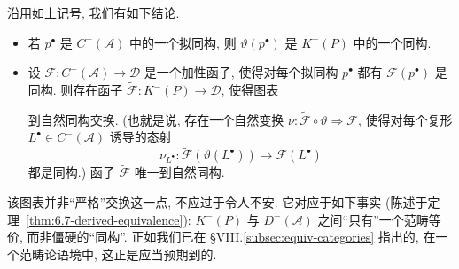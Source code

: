\begin{theorem}\label{thm:6.9-derived-universal}
沿用如上记号, 我们有如下结论.

\begin{itemize}
\item 若 $p^\bullet$ 是 $C^{-}(\mathcal{A})$ 中的一个拟同构, 则 $\vartheta(p^\bullet)$ 是 $K^{-}(P)$ 中的一个同构.
\item 设 $\mathcal{F}:C^{-}(\mathcal{A})\to\mathcal{D}$ 是一个加性函子, 使得对每个拟同构 $p^\bullet$ 都有 $\mathcal{F}(p^\bullet)$ 是同构. 则存在函子 $\widetilde{\mathcal F}:K^{-}(P)\to\mathcal{D}$, 使得图表

\begin{center}
\end{center}

\noindent 到自然同构交换. (也就是说, 存在一个自然变换 $\nu:\widetilde{\mathcal F}\circ\vartheta\Rightarrow\mathcal F$, 使得对每个复形 $L^\bullet\in C^{-}(\mathcal{A})$ 诱导的态射
\[
\nu_{L^\bullet}:\widetilde{\mathcal F}(\vartheta(L^\bullet))\longrightarrow\mathcal F(L^\bullet)
\]
都是同构.) 函子 $\widetilde{\mathcal F}$ 唯一到自然同构.
\end{itemize}
\end{theorem}

\noindent 该图表并非``严格''交换这一点, 不应过于令人不安. 它对应于如下事实 (陈述于定理~\ref{thm:6.7-derived-equivalence}): $K^{-}(P)$ 与 $D^{-}(\mathcal{A})$ 之间``只有''一个范畴等价, 而非僵硬的``同构''. 正如我们已在 §VIII.\ref{subsec:equiv-categories} 指出的, 在一个范畴论语境中, 这正是应当预期到的.

